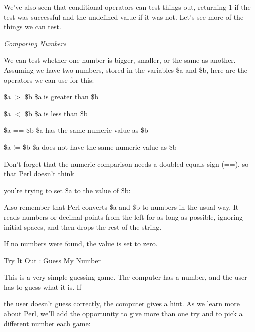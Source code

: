 \documentclass[a4paper,11pt]{book}
\begin{document}
\noindent 

\noindent We've also seen that conditional operators can test things out, returning 1 if the test was successful and the undefined value if it was not. Let's see more of the things we can test.

\noindent 

\noindent 

\noindent \textit{Comparing Numbers}

\noindent We can test whether one number is bigger, smaller, or the same as another. Assuming we have two numbers, stored in the variables \$a and \$b, here are the operators we can use for this:

\noindent 

\noindent \$a $>$ \$b \$a is greater than \$b

\noindent 

\noindent \$a $<$ \$b \$a is less than \$b

\noindent 

\noindent \$a == \$b \$a has the same numeric value as \$b

\noindent 

\noindent \$a != \$b \$a does not have the same numeric value as \$b

\noindent 

\noindent 

\noindent Don't forget that the numeric comparison needs a doubled equals sign (==), so that Perl doesn't think

\noindent you're trying to set \$a to the value of \$b:

\noindent 

\noindent Also remember that Perl converts \$a and \$b to numbers in the usual way. It reads numbers or decimal points from the left for as long as possible, ignoring initial spaces, and then drops the rest of the string.

\noindent If no numbers were found, the value is set to zero.

\noindent 

\noindent Try It Out : Guess My Number

\noindent 

\noindent 

\noindent This is a very simple guessing game. The computer has a number, and the user has to guess what it is. If

\noindent the user doesn't guess correctly, the computer gives a hint. As we learn more about Perl, we'll add the opportunity to give more than one try and to pick a different number each game:
\end{document}
